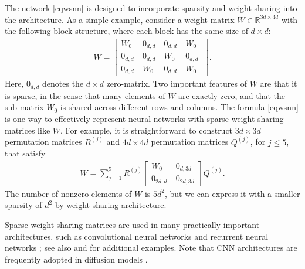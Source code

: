 \documentclass[twoside,11pt]{article}
\newcommand{\bbR}{{\mathbb R}}
\newcommand{\bean}{\setlength\arraycolsep{1pt}\begin{eqnarray*}}
\newcommand{\eean}{\end{eqnarray*}}
\begin{document}
The network \eqref{eqwsnn} is designed to incorporate sparsity and weight-sharing into the architecture.
As a simple example, consider a weight matrix $W \in \bbR^{3d \times 4d}$ with the following block structure, where each block has the same size of $d \times d$:
\bean
W = 
\begin{bmatrix}
W_0 \ & 0_{d,d} \ & 0_{d,d} \ & W_0 \
\\
0_{d,d} \ & 0_{d,d} \ & W_0 \ & 0_{d,d} \
\\
0_{d,d} \ & W_0 \ & 0_{d,d} \ & W_0 \
\end{bmatrix}.
\eean
Here, $0_{d,d}$ denotes the $d \times d$ zero-matrix.
Two important features of $W$ are that it is sparse, in the sense that many elements of $W$ are exactly zero, and that the sub-matrix $W_0$ is shared across different rows and columns.
The formula \eqref{eqwsnn} is one way to effectively represent neural networks with sparse weight-sharing matrices like $W$. For example, it is straightforward to construct $3d \times 3d$ permutation matrices $R^{(j)}$ and $4d \times 4d$ permutation matrices $Q^{(j)}$, for $j \leq 5$, that satisfy
\bean
W = \sum_{j=1}^{5} 
R^{(j)}
\begin{bmatrix}
W_0 \ & 0_{d,3d}
\\
0_{2d,d} \ & 0_{2d,3d} 
\end{bmatrix}
Q^{(j)}.
\eean
The number of nonzero elements of $W$ is $5d^2$, but we can express it with a smaller sparsity of $d^2$ by weight-sharing architecture.

Sparse weight-sharing matrices are used in many practically important architectures, such as convolutional neural networks \citep{lecun1989handwritten, krizhevsky2012imagenet} and recurrent neural networks \citep{rumelhart1986learning, sutskever2014sequence}; see also \citet{zhang2021beyond} and \citet{jagtap2022deep} for additional examples. Note that CNN architectures are frequently adopted in diffusion models \citep{sohl2015deep, ho2020denoising, ronneberger2015unet}.
\end{document}
